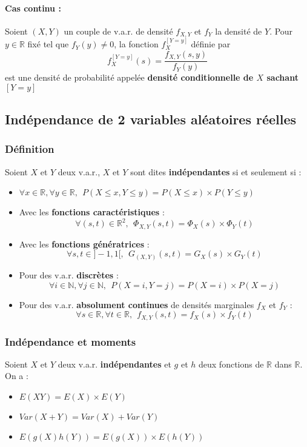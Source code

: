 \documentclass[10pt,a4paper,twoside]{article}
\begin{document}
\paragraph{Cas continu :} Soient $(X,Y)$ un couple de v.a.r. de densité $f_{X,Y}$ et $f_{Y}$ la densité de $Y$. Pour $y\in \mathbb{R}$ fixé tel que $f_{Y}(y)\neq 0$, la fonction $f_{X}^{[Y=y]}$ définie par 
$$f_{X}^{[Y=y]}(s)=\frac{f_{X,Y}(s,y)}{f_{Y}(y)}$$
est une densité de probabilité appelée \textbf{densité conditionnelle de $X$ sachant} $[Y=y]$

\subsection{Indépendance de 2 variables aléatoires réelles}
\subsubsection{Définition}
Soient $X$ et $Y$ deux v.a.r., $X$ et $Y$ sont dites \textbf{indépendantes} si et seulement si :
\begin{itemize}
\item $\forall x\in \mathbb{R}, \forall y\in \mathbb{R}, \ \ P(X\leqslant x, Y\leqslant y) = P(X\leqslant x)\times P(Y\leqslant y)$
\item Avec les \textbf{fonctions caractéristiques} :
$$\forall (s,t) \in \mathbb{R}^{2},\ \ \Phi_{X,Y}(s,t)=\Phi_{X}(s)\times\Phi_{Y}(t)$$
\item Avec les \textbf{fonctions génératrices} :
$$\forall s,t \in ]-1,1[,\ \ G_{(X,Y)}(s,t)=G_{X}(s)\times G_{Y}(t)$$
\item Pour des v.a.r. \textbf{discrètes} :
$$\forall i\in \mathbb{N}, \forall j\in \mathbb{N}, \ \ P(X=i,Y=j)=P(X=i)\times P(X=j)$$
\item Pour des v.a.r. \textbf{absolument continues} de densités marginales $f_{X}$ et $f_{Y}$ :
$$\forall s \in \mathbb{R}, \forall t\in \mathbb{R},\ \ f_{X,Y}(s,t)=f_{X}(s)\times f_{Y}(t)$$
\end{itemize}

\subsubsection{Indépendance et moments}
Soient $X$ et $Y$ deux v.a.r. \textbf{indépendantes} et $g$ et $h$ deux fonctions de $\mathbb{R}$ dans $\mathbb{R}$. On a :
\begin{itemize}
\item $E(XY)=E(X)\times E(Y)$
\item $Var(X+Y) = Var(X)+Var(Y)$
\item $E(g(X)h(Y))=E(g(X))\times E(h(Y))$
\end{itemize}
\end{document}
